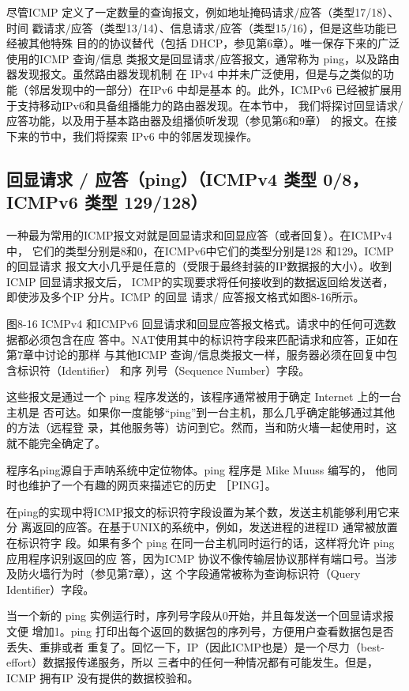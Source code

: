 尽管ICMP 定义了一定数量的查询报文，例如地址掩码请求/应答（类型17/18）、时间
戳请求/应答（类型13/14）、信息请求/应答（类型15/16），但是这些功能已经被其他特殊
目的的协议替代（包括 DHCP，参见第6章）。唯一保存下来的广泛使用的ICMP 查询/信息
类报文是回显请求/应答报文，通常称为 ping，以及路由器发现报文。虽然路由器发现机制
在 IPv4 中并未广泛使用，但是与之类似的功能（邻居发现中的一部分）在IPv6 中却是基本
的。此外，ICMPv6 已经被扩展用于支持移动IPv6和具备组播能力的路由器发现。在本节中，
我们将探讨回显请求/ 应答功能，以及用于基本路由器及组播侦听发现（参见第6和9章）
的报文。在接下来的节中，我们将探索 IPv6 中的邻居发现操作。

\subsection{回显请求 / 应答（ping）（ICMPv4 类型 0/8，ICMPv6 类型 129/128）}
一种最为常用的ICMP报文对就是回显请求和回显应答（或者回复）。在ICMPv4 中，
它们的类型分别是8和0，在ICMPv6中它们的类型分别是128 和129。ICMP 的回显请求
报文大小几乎是任意的（受限于最终封装的IP数据报的大小）。收到ICMP 回显请求报文后，
ICMP的实现要求将任何接收到的数据返回给发送者，即使涉及多个IP 分片。ICMP 的回显
请求/ 应答报文格式如图8-16所示。

图8-16 ICMPv4 和ICMPv6 回显请求和回显应答报文格式。请求中的任何可选数据都必须包含在应
答中。NAT使用其中的标识符字段来匹配请求和应答，正如在第7章中讨论的那样
与其他ICMP 查询/信息类报文一样，服务器必须在回复中包含标识符（Identifier） 和序
列号（Sequence Number）字段。

这些报文是通过一个 ping 程序发送的，该程序通常被用于确定 Internet 上的一台主机是
否可达。如果你一度能够“ping”到一台主机，那么几乎确定能够通过其他的方法（远程登
录，其他服务等）访问到它。然而，当和防火墻一起使用时，这就不能完全确定了。

\begin{tcolorbox}
	程序名ping源自于声呐系统中定位物体。ping 程序是 Mike Muuss 编写的，
	他同时也维护了一个有趣的网页来描述它的历史 ［PING］。
\end{tcolorbox}

在ping的实现中将ICMP报文的标识符字段设置为某个数，发送主机能够利用它来分
离返回的应答。在基于UNIX的系统中，例如，发送进程的进程ID 通常被放置在标识符字
段。如果有多个 ping 在同一台主机同时运行的话，这样将允许 ping 应用程序识别返回的应
答，因为ICMP 协议不像传输层协议那样有端口号。当涉及防火墙行为时（参见第7章），这
个字段通常被称为查询标识符（Query Identifier）字段。

当一个新的 ping 实例运行时，序列号字段从0开始，并且每发送一个回显请求报文便
增加1。ping 打印出每个返回的数据包的序列号，方便用户查看数据包是否丢失、重排或者
重复了。回忆一下，IP（因此ICMP也是）是一个尽力（best-effort）数据报传递服务，所以
三者中的任何一种情况都有可能发生。但是，ICMP 拥有IP 没有提供的数据校验和。

